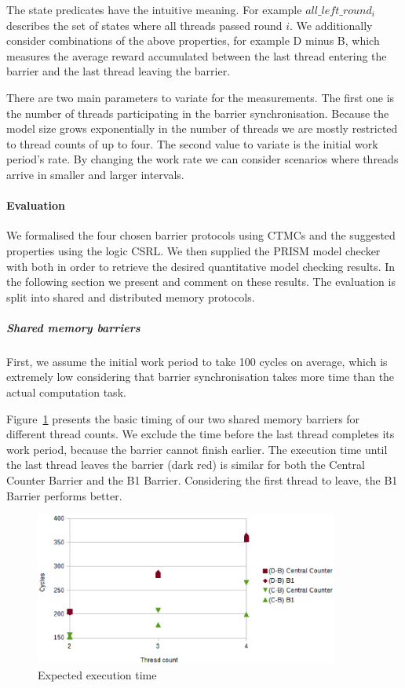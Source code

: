 \documentclass[a4paper, 10pt]{article}
\begin{document}
\noindent The state predicates have the intuitive meaning. For example $\mathit{all\_left\_round_{i}}$ describes the set of states where all threads passed round $i$.
We additionally consider combinations of the above properties, for example D minus B, which measures the average reward accumulated between the last thread entering the barrier and the last thread leaving the barrier.

There are two main parameters to variate for the measurements. The first one is the number of threads participating in the barrier synchronisation. Because the model size grows exponentially in the number of threads we are mostly restricted to thread counts of up to four.
The second value to variate is the initial work period's rate. By changing the work rate we can consider scenarios where threads arrive in smaller and larger intervals.

\paragraph{Evaluation}
\label{ssssec:analysis-modelchecking-quantitative-properties-evaluation}
We formalised the four chosen barrier protocols using CTMCs and the suggested properties using the logic CSRL.
We then supplied the PRISM model checker with both in order to retrieve the desired quantitative model checking results.
In the following section we present and comment on these results.
The evaluation is split into shared and distributed memory protocols.

\subparagraph{Shared memory barriers}
\label{sssssec:analysis-modelchecking-quantitative-properties-evaluation-shared}
First, we assume the initial work period to take 100 cycles on average, which is extremely low considering that barrier synchronisation takes more time than the actual computation task.

Figure~\ref{fig:c1-time-work-100-B-C-D} presents the basic timing of our two shared memory barriers for different thread counts. We exclude the time before the last thread completes its work period, because the barrier cannot finish earlier.
The execution time until the last thread leaves the barrier (dark red) is similar for both the Central Counter Barrier and the B1 Barrier.
Considering the first thread to leave, the B1 Barrier performs better.

\begin{figure}[htbp]
	\centering
	\includegraphics[width=10cm]{charts/c1-time-work-100-B-C-D}
	\caption{Expected execution time}
	\label{fig:c1-time-work-100-B-C-D}
\end{figure}
\end{document}
